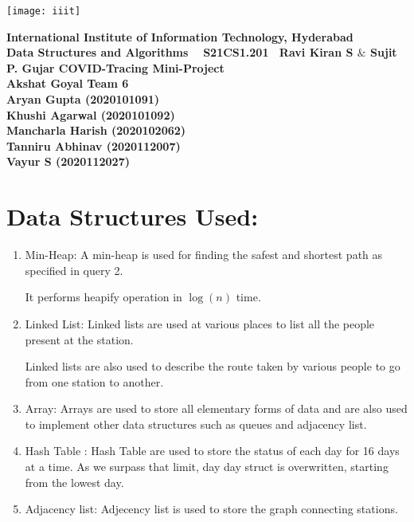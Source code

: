 \documentclass{article}
\begin{document}
\begin{titlepage}

\centering
\vfill
\texttt{[image: iiit]}
\vskip1cm

{\bfseries\Large
		International Institute of Information Technology, Hyderabad\\
        \vskip0.5cm
        Data Structures and Algorithms \
        \vskip1cm
        S21CS1.201\
        \vskip0.5cm
        Ravi Kiran S $\&$ Sujit P. Gujar 
        \vskip2cm
        COVID-Tracing Mini-Project\\
        \vskip0.5cm
        Akshat Goyal
        \vskip0.5cm
       Team 6}\\
        \vskip 1cm
{\bfseries      
    Aryan Gupta (2020101091)\\
        \vskip 0.5cm
        Khushi Agarwal (2020101092)\\
        \vskip 0.5cm
        Mancharla Harish (2020102062)\\
        \vskip 0.5cm
        Tanniru Abhinav (2020112007)\\
        \vskip 0.5cm
        Vayur S (2020112027)}
    


\end{titlepage}
\newpage

\section{Data Structures Used:}

\begin{enumerate}
    \item Min-Heap: A min-heap is used for finding the safest and shortest path as specified in query 2.
    
	It performs heapify operation in $\log(n)$ time.
    \item Linked List: Linked lists are used at various places to list all the people present at the station.
	
	Linked lists are also used to describe the route taken by various people to go from one station to another.
    \item Array: Arrays are used to store all elementary forms of data and are also used to implement other data structures such as queues and adjacency list.
    \item Hash Table : Hash Table are used to store the status of each day for 16 days at a time. As we surpass that limit, day day struct is overwritten, starting from the lowest day.
    \item Adjacency list:
	Adjecency list is used to store the graph connecting stations.

\end{enumerate}
\end{document}
